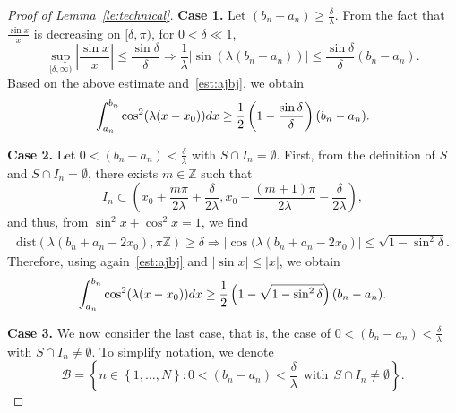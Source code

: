 \documentclass[a4paper,reqno]{amsart}
\theoremstyle{definition}
\numberwithin{equation}{section}
\def \d {{\rm{d}}}
\begin{document}
\begin{proof}[Proof of Lemma~\ref{le:technical}]
\smallskip
\textbf{Case 1.} Let $(b_{n}-a_{n})\ge \frac{\delta}{\lambda}$. From the fact that $\frac{\sin x}{x}$ is decreasing on $[\delta,\pi)$, for $0<\delta\ll 1$, 
\begin{equation*}
\sup_{[\delta,\infty)}\left|\frac{\sin x}{x}\right|\le \frac{\sin \delta}{\delta} \Longrightarrow \frac{1}{\lambda}\left|\sin \left(\lambda(b_{n}-a_{n})\right)\right|\le \frac{\sin \delta}{\delta}(b_{n}-a_{n}).
\end{equation*}
Based on the above estimate and~\eqref{est:ajbj}, we obtain
\begin{equation}\label{est:case1}
\int_{a_{n}}^{b_{n}}\cos^{2}(\lambda(x-x_{0}))\d x
\ge \frac{1}{2}\left(1-\frac{\sin \delta}{\delta}\right)(b_{n}-a_{n}).
\end{equation}

\textbf{Case 2.} Let $0<(b_{n}-a_{n})< \frac{\delta}{\lambda}$ with $S\cap I_{n}= \emptyset$. First, from the definition of $S$ and $S\cap I_{n}=\emptyset$, there exists $m\in \mathbb{Z}$ such that 
\begin{equation*}
    I_{n}\subset \left(x_{0}+\frac{m \pi }{2\lambda}+\frac{\delta}{2\lambda},x_{0}+\frac{ (m+1)\pi}{2\lambda}-\frac{\delta}{2\lambda}\right),
    \end{equation*}
    and thus, from $\sin^{2}x+\cos^{2}x=1$, we find
    \begin{equation*}
    \begin{aligned}
   \mbox{dist}(\lambda(b_{n}+a_{n}-2x_{0}),\pi\mathbb{Z})\ge \delta\Longrightarrow
    \left|\cos (\lambda(b_{n}+a_{n}-2x_{0})\right|\le \sqrt{1-\sin^{2}\delta}.
    \end{aligned}
    \end{equation*}
    Therefore, using again~\eqref{est:ajbj} and $|\sin x|\le |x|$, we obtain
    \begin{equation}\label{est:case2}
        \int_{a_{n}}^{b_{n}}\cos^{2}(\lambda(x-x_{0}))\d x\ge
        \frac{1}{2}\left(1-\sqrt{1-\sin^{2}\delta}\right)(b_{n}-a_{n}).
        \end{equation}

\textbf{Case 3.} We now consider the last case, that is, the case of $0<(b_{n}-a_{n})< \frac{\delta}{\lambda}$ with $S\cap I_{n}\ne  \emptyset$. To simplify notation, we denote 
\begin{equation*}
    \mathcal{B}=\left\{n\in\left\{1,\dots,N\right\}:0<(b_{n}-a_{n})< \frac{\delta}{\lambda}\ \ \mbox{with} \ \ S\cap I_{n}\ne  \emptyset\right\}.
\end{equation*}


\end{proof}
\end{document}
